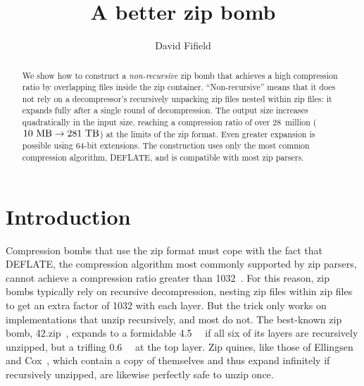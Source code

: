 \documentclass[letterpaper,twocolumn,10pt]{article}
\newcommand{\MB}{\mega\byte}
\newcommand{\TB}{\tera\byte}
\newcommand{\PB}{\peta\byte}
\begin{document}
\date{}

\title{\Large \bf A better zip bomb}

\author{
{\rm David Fifield}
}

\maketitle

\begin{abstract}
We show how to construct a
\emph{non-recursive} zip bomb
that achieves a high compression ratio by
overlapping files inside the zip container.
``Non-recursive'' means that it does not rely on
a decompressor's recursively unpacking zip files nested within zip files:
it expands fully after a single round of decompression.
The output size increases quadratically in the input size,
reaching a compression ratio of over 28~million
($\SI{10}{\MB} \rightarrow \SI{281}{\TB}$)
at the limits of the zip format.
Even greater expansion is possible using
64-bit extensions.
The construction uses only the most common compression algorithm, DEFLATE,
and is compatible with most zip parsers.
\end{abstract}


\section{Introduction}
\label{sec:intro}

Compression bombs that use the zip format
must cope with the fact that DEFLATE,
the compression algorithm most commonly supported by zip parsers,
cannot achieve a compression ratio greater than
\num{1032}~\cite{zlib_tech}.
For this reason, zip bombs typically rely on recursive decompression,
nesting zip files within zip files to get an extra factor of 1032 with each layer.
But the trick only works on implementations that
unzip recursively, and most do not.
The best-known zip bomb, 42.zip~\cite{42.zip},
expands to a formidable \SI{4.5}{\PB}
if all six of its layers are recursively unzipped,
but a trifling \SI{0.6}{\MB} at the top layer.
Zip quines, like those of
Ellingsen~\cite{ellingsen}
and Cox~\cite{cox},
which contain a copy of themselves
and thus expand infinitely if recursively unzipped,
are likewise perfectly safe to unzip once.
\end{document}
